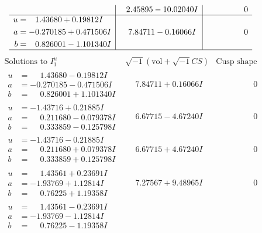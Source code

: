 \documentclass[1p]{elsarticle_modified}
\theoremstyle{definition}
\newcommand{\I}{\sqrt{-1}}
\begin{document}
$$\begin{array}{c|c|c}
 & \phantom{-}2.45895 - 10.02040 I & \phantom{-0.000000 } 0 \\ \hline\begin{aligned}
u &= \phantom{-}1.43680 + 0.19812 I \\
a &= -0.270185 + 0.471506 I \\
b &= \phantom{-}0.826001 - 1.101340 I\end{aligned}
 & \phantom{-}7.84711 - 0.16066 I & \phantom{-0.000000 } 0\\
 \hline 
 \end{array}$$\newpage$$\begin{array}{c|c|c}  
\text{Solutions to }I^u_{1}& \I (\text{vol} + \sqrt{-1}CS) & \text{Cusp shape}\\
 \hline 
\begin{aligned}
u &= \phantom{-}1.43680 - 0.19812 I \\
a &= -0.270185 - 0.471506 I \\
b &= \phantom{-}0.826001 + 1.101340 I\end{aligned}
 & \phantom{-}7.84711 + 0.16066 I & \phantom{-0.000000 } 0 \\ \hline\begin{aligned}
u &= -1.43716 + 0.21885 I \\
a &= \phantom{-}0.211680 - 0.079378 I \\
b &= \phantom{-}0.333859 - 0.125798 I\end{aligned}
 & \phantom{-}6.67715 - 4.67240 I & \phantom{-0.000000 } 0 \\ \hline\begin{aligned}
u &= -1.43716 - 0.21885 I \\
a &= \phantom{-}0.211680 + 0.079378 I \\
b &= \phantom{-}0.333859 + 0.125798 I\end{aligned}
 & \phantom{-}6.67715 + 4.67240 I & \phantom{-0.000000 } 0 \\ \hline\begin{aligned}
u &= \phantom{-}1.43561 + 0.23691 I \\
a &= -1.93769 + 1.12814 I \\
b &= \phantom{-}0.76225 + 1.19358 I\end{aligned}
 & \phantom{-}7.27567 + 9.48965 I & \phantom{-0.000000 } 0 \\ \hline\begin{aligned}
u &= \phantom{-}1.43561 - 0.23691 I \\
a &= -1.93769 - 1.12814 I \\
b &= \phantom{-}0.76225 - 1.19358 I\end{aligned}

\end{array}$$
\end{document}

